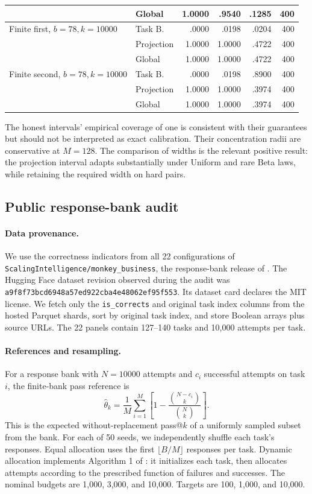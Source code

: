 \documentclass[twoside]{article}
\begin{document}
\begin{table}[t]
\begin{tabular}{llrrrr}
 & Global & 1.0000 & .9540 & .1285 & 400\\
\midrule
Finite first, \(b=78,k=10000\) & Task B. & .0000 & .0198 & .0204 & 400\\
 & Projection & 1.0000 & 1.0000 & .4722 & 400\\
 & Global & 1.0000 & 1.0000 & .4722 & 400\\
Finite second, \(b=78,k=10000\) & Task B. & .0000 & .0198 & .8900 & 400\\
 & Projection & 1.0000 & 1.0000 & .3974 & 400\\
 & Global & 1.0000 & 1.0000 & .3974 & 400\\
\bottomrule
\end{tabular}
\end{table}

The honest intervals' empirical coverage of one is consistent with their
guarantees but should not be interpreted as exact calibration. Their
concentration radii are conservative at \(M=128\). The comparison of widths
is the relevant positive result: the projection interval adapts substantially
under Uniform and rare Beta laws, while retaining the required width on hard
pairs.

\subsection{Public response-bank audit}

\paragraph{Data provenance.}
We use the correctness indicators from all 22 configurations of
\texttt{ScalingIntelligence/monkey\_business}, the response-bank release of
\citet{brown2024}. The Hugging Face dataset revision observed during the
audit was
\texttt{a9f8f73bcd6948a57ed922cba4e48062ef95f553}. Its dataset card declares
the MIT license. We fetch only the \texttt{is\_corrects} and original task
index columns from the hosted Parquet shards, sort by original task index, and
store Boolean arrays plus source URLs. The 22 panels contain 127--140 tasks
and 10,000 attempts per task.

\paragraph{References and resampling.}
For a response bank with \(N=10000\) attempts and \(c_i\) successful attempts
on task \(i\), the finite-bank pass reference is
\[
 \widehat\theta_k=
 \frac1M\sum_{i=1}^M\left[
 1-\frac{\binom{N-c_i}{k}}{\binom Nk}\right].
\]
This is the expected without-replacement pass@\(k\) of a uniformly sampled
subset from the bank. For each of 50 seeds, we independently shuffle each
task's responses. Equal allocation uses the first
\(\lfloor B/M\rfloor\) responses per task. Dynamic allocation implements
Algorithm 1 of \citet{kazdan2025}: it initializes each task, then allocates
attempts according to the prescribed function of failures and successes. The
nominal budgets are 1,000, 3,000, and 10,000. Targets are 100, 1,000, and
10,000.
\end{document}
